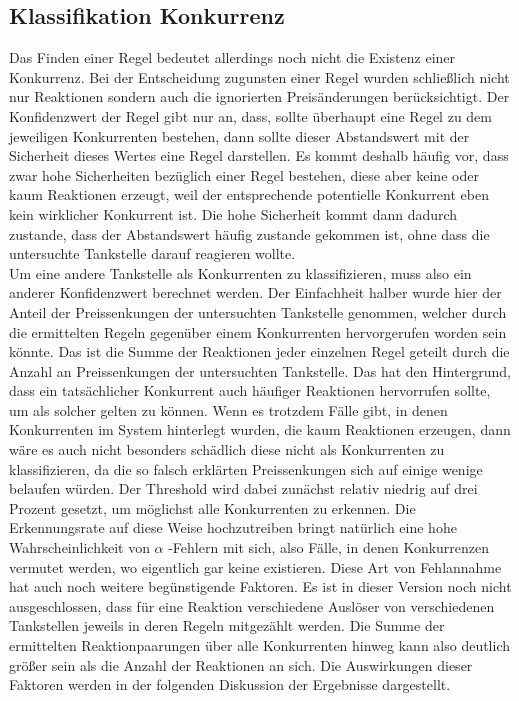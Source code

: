 \subsection{Klassifikation Konkurrenz}
Das Finden einer Regel bedeutet allerdings noch nicht die Existenz einer Konkurrenz. Bei der Entscheidung zugunsten einer Regel wurden schließlich nicht nur Reaktionen sondern auch die ignorierten Preisänderungen berücksichtigt. Der Konfidenzwert der Regel gibt nur an, dass, sollte überhaupt eine Regel zu dem jeweiligen Konkurrenten bestehen, dann sollte dieser Abstandswert mit der Sicherheit dieses Wertes eine Regel darstellen. Es kommt deshalb häufig vor, dass zwar hohe Sicherheiten bezüglich einer Regel bestehen, diese aber keine oder kaum Reaktionen erzeugt, weil der entsprechende potentielle Konkurrent eben kein wirklicher Konkurrent ist. Die hohe Sicherheit kommt dann dadurch zustande, dass der Abstandswert häufig zustande gekommen ist, ohne dass die untersuchte Tankstelle darauf reagieren wollte.\\
Um eine andere Tankstelle als Konkurrenten zu klassifizieren, muss also ein anderer Konfidenzwert berechnet werden. Der Einfachheit halber wurde hier der Anteil der Preissenkungen der untersuchten Tankstelle genommen, welcher durch die ermittelten Regeln gegenüber einem Konkurrenten hervorgerufen worden sein könnte. Das ist die Summe der Reaktionen jeder einzelnen Regel geteilt durch die Anzahl an Preissenkungen der untersuchten Tankstelle. Das hat den Hintergrund, dass ein tatsächlicher Konkurrent auch häufiger Reaktionen hervorrufen sollte, um als solcher gelten zu können. Wenn es trotzdem Fälle gibt, in denen Konkurrenten im System hinterlegt wurden, die kaum Reaktionen erzeugen, dann wäre es auch nicht besonders schädlich diese nicht als Konkurrenten zu klassifizieren, da die so falsch erklärten Preissenkungen sich auf einige wenige belaufen würden. Der Threshold wird dabei zunächst relativ niedrig auf drei Prozent gesetzt, um möglichst alle Konkurrenten zu erkennen. Die Erkennungsrate auf diese Weise hochzutreiben bringt natürlich eine hohe Wahrscheinlichkeit von $\alpha$ -Fehlern mit sich, also Fälle, in denen Konkurrenzen vermutet werden, wo eigentlich gar keine existieren. Diese Art von Fehlannahme hat auch noch weitere begünstigende Faktoren. Es ist in dieser Version noch nicht ausgeschlossen, dass für eine Reaktion verschiedene Auslöser von verschiedenen Tankstellen jeweils in deren Regeln mitgezählt werden. Die Summe der ermittelten Reaktionpaarungen über alle Konkurrenten hinweg kann also deutlich größer sein als die Anzahl der Reaktionen an sich. Die Auswirkungen dieser Faktoren werden in der folgenden Diskussion der Ergebnisse dargestellt.